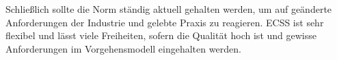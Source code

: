 Schließlich sollte die Norm ständig aktuell gehalten werden, um auf geänderte Anforderungen der Industrie und gelebte Praxis zu reagieren.
ECSS ist sehr flexibel und lässt viele Freiheiten, sofern die Qualität hoch ist und gewisse Anforderungen im Vorgehensmodell eingehalten werden.





























